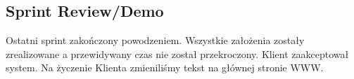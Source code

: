 
\subsection{Sprint Review/Demo}
Ostatni sprint zakończony powodzeniem. Wszystkie założenia zostały zrealizowane a przewidywany czas nie został przekroczony. Klient zaakceptował system. Na życzenie Klienta zmieniliśmy tekst na głównej stronie WWW.